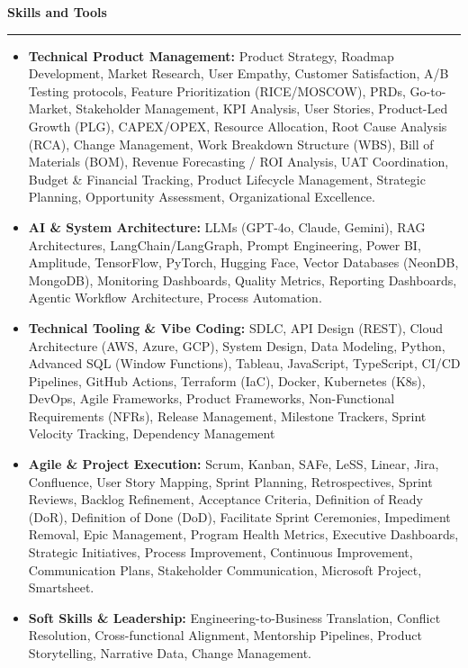 \documentclass[9pt,letterpaper]{article} %
\newenvironment{rSection}[1]{ %
  \sectionskip
 \textbf{\Large #1} %
  \sectionlineskip
  \hrule %
  \begin{list}{}{ %
    \setlength{\leftmargin}{-0em} %
  }
  \item[]
}{
  \end{list}
}
\def\sectionlineskip{\smallskip} %
\def\sectionskip{} %
\begin{document}
\begin{rSection}{Skills and Tools}
\begin{itemize}[left=-1.5em, labelsep=.1cm, labelwidth=.2cm, itemsep=0.0em, topsep=0pt]
\item \textbf{Technical Product Management:} Product Strategy, Roadmap Development, Market Research, User Empathy, Customer Satisfaction, A/B Testing protocols, Feature Prioritization (RICE/MOSCOW), PRDs, Go-to-Market, Stakeholder Management, KPI Analysis, User Stories, Product-Led Growth (PLG), CAPEX/OPEX, Resource Allocation, Root Cause Analysis (RCA), Change Management, Work Breakdown Structure (WBS), Bill of Materials (BOM), Revenue Forecasting / ROI Analysis, UAT Coordination, Budget \& Financial Tracking, Product Lifecycle Management, Strategic Planning, Opportunity Assessment, Organizational Excellence.
\item \textbf{AI \& System Architecture:} LLMs (GPT-4o, Claude, Gemini), RAG Architectures, LangChain/LangGraph, Prompt Engineering, Power BI, Amplitude, TensorFlow, PyTorch, Hugging Face, Vector Databases (NeonDB, MongoDB), Monitoring Dashboards, Quality Metrics, Reporting Dashboards, Agentic Workflow Architecture, Process Automation.
\item \textbf{Technical Tooling \& Vibe Coding:} SDLC, API Design (REST), Cloud Architecture (AWS, Azure, GCP), System Design, Data Modeling, Python, Advanced SQL (Window Functions), Tableau, JavaScript, TypeScript, CI/CD Pipelines, GitHub Actions, Terraform (IaC), Docker, Kubernetes (K8s), DevOps, Agile Frameworks, Product Frameworks, Non-Functional Requirements (NFRs), Release Management, Milestone Trackers, Sprint Velocity Tracking, Dependency Management
\item \textbf{Agile \& Project Execution:} Scrum, Kanban, SAFe, LeSS, Linear, Jira, Confluence, User Story Mapping, Sprint Planning, Retrospectives, Sprint Reviews, Backlog Refinement, Acceptance Criteria, Definition of Ready (DoR), Definition of Done (DoD), Facilitate Sprint Ceremonies, Impediment Removal, Epic Management, Program Health Metrics, Executive Dashboards, Strategic Initiatives, Process Improvement, Continuous Improvement, Communication Plans, Stakeholder Communication, Microsoft Project, Smartsheet.
\item \textbf{Soft Skills \& Leadership:} Engineering-to-Business Translation, Conflict Resolution, Cross-functional Alignment, Mentorship Pipelines, Product Storytelling, Narrative Data, Change Management.
\end{itemize}
\end{rSection}%
\end{document}
